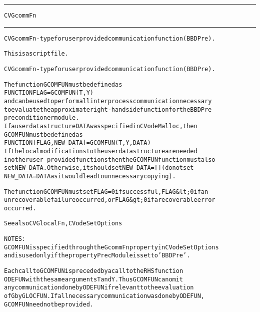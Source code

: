 \begin{samepage}
\hrule
\begin{center}
{\large \verb!CVGcommFn!}
\label{p:CVGcommFn}
\end{center}
\hrule\vspace{0.1in}



\begin{alltt}
CVGcommFn - type for user provided communication function (BBDPre).
\end{alltt}

\end{samepage}



\begin{samepage}


\begin{alltt}
This is a script file. 
\end{alltt}

\end{samepage}



\begin{alltt}
CVGcommFn - type for user provided communication function (BBDPre).

   The function GCOMFUN must be defined as 
        FUNCTION FLAG = GCOMFUN(T, Y)
   and can be used to perform all interprocess communication necessary
   to evaluate the approximate right-hand side function for the BBDPre
   preconditioner module.
   If a user data structure DATA was specified in CVodeMalloc, then
   GCOMFUN must be defined as
        FUNCTION [FLAG, NEW_DATA] = GCOMFUN(T, Y, DATA)
   If the local modifications to the user data structure are needed 
   in other user-provided functions then the GCOMFUN function must also 
   set NEW_DATA. Otherwise, it should set NEW_DATA=[] (do not set 
   NEW_DATA = DATA as it would lead to unnecessary copying).

   The function GCOMFUN must set FLAG=0 if successful, FLAG&lt;0 if an
   unrecoverable failure occurred, or FLAG&gt;0 if a recoverable error
   occurred.

   See also CVGlocalFn, CVodeSetOptions

   NOTES:
     GCOMFUN is specified through the GcommFn property in CVodeSetOptions
     and is used only if the property PrecModule is set to 'BBDPre'.

     Each call to GCOMFUN is preceded by a call to the RHS function
     ODEFUN with the same arguments T and Y. Thus GCOMFUN can omit
     any communication done by ODEFUN if relevant to the evaluation
     of G by GLOCFUN. If all necessary communication was done by ODEFUN,
     GCOMFUN need not be provided.
\end{alltt}






\vspace{0.1in}
